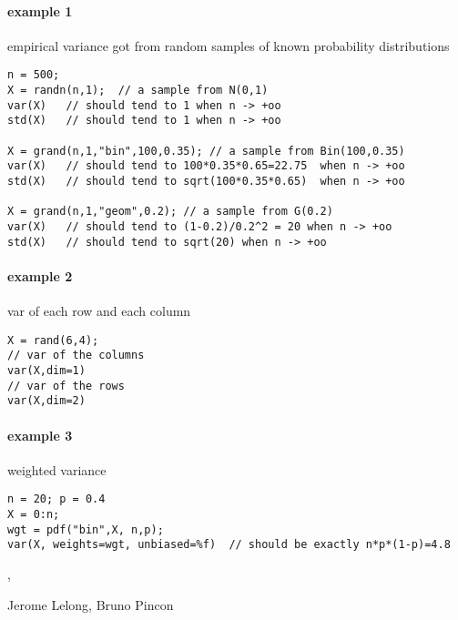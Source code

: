 \begin{examples}
\paragraph{example 1} empirical variance got from random samples of known probability distributions 
\begin{Verbatim}
n = 500;
X = randn(n,1);  // a sample from N(0,1)
var(X)   // should tend to 1 when n -> +oo
std(X)   // should tend to 1 when n -> +oo

X = grand(n,1,"bin",100,0.35); // a sample from Bin(100,0.35)
var(X)   // should tend to 100*0.35*0.65=22.75  when n -> +oo
std(X)   // should tend to sqrt(100*0.35*0.65)  when n -> +oo

X = grand(n,1,"geom",0.2); // a sample from G(0.2)
var(X)   // should tend to (1-0.2)/0.2^2 = 20 when n -> +oo
std(X)   // should tend to sqrt(20) when n -> +oo
\end{Verbatim}

\paragraph{example 2} var of each row and each column
\begin{Verbatim}
X = rand(6,4);
// var of the columns
var(X,dim=1)
// var of the rows
var(X,dim=2)
\end{Verbatim}

\paragraph{example 3} weighted variance
\begin{Verbatim}
n = 20; p = 0.4
X = 0:n;
wgt = pdf("bin",X, n,p);
var(X, weights=wgt, unbiased=%f)  // should be exactly n*p*(1-p)=4.8
\end{Verbatim}


\end{examples}

\begin{manseealso}
  , 
\end{manseealso}

\begin{authors}
  Jerome Lelong, Bruno Pincon
\end{authors}
